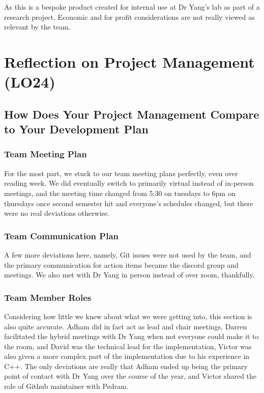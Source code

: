 \documentclass{article}
\begin{document}
As this is a bespoke product created for internal use at Dr Yang's lab as part of a research project, Economic and for profit considerations are not really viewed as relevant by
the team.

\section{Reflection on Project Management (LO24)}


\subsection{How Does Your Project Management Compare to Your Development Plan}

\subsubsection{Team Meeting Plan}
For the most part, we stuck to our team meeting plans perfectly, even over reading week. We did eventually switch to primarily virtual instead of in-person meetings, and the
meeting time changed from 5:30 on tuesdays to 6pm on thursdays once second semester hit and everyone's schedules changed, but there were no real deviations otherwise.

\subsubsection{Team Communication Plan}
A few  more deviations here, namely, Git issues were not used by the team, and the primary communication for action items became the discord group and meetings.
We also met with Dr Yang in person instead of over zoom, thankfully.
\subsubsection{Team Member Roles}
Considering how little we knew about what we were getting into, this section is also quite accurate. Adham did in fact act as lead and chair meetings, Darren facilitated the
hybrid meetings with Dr Yang when not everyone could make it to the room, and David was the technical lead for the implementation, Victor was also given a more complex part
of the implementation due to his experience in C++. The only deviations are really that Adham ended up being the primary point of contact with Dr Yang over the course of the
year, and Victor shared the role of Github maintainer with Pedram.
\end{document}
